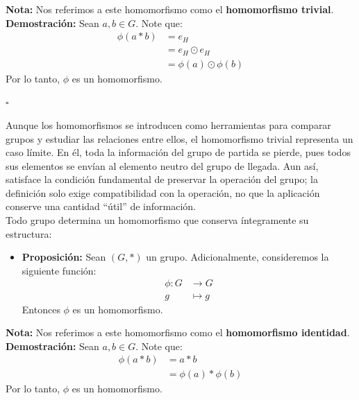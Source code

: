 \documentclass[10 pt]{article}
\begin{document}
\Large{\textbf{Nota:} Nos referimos a este homomorfismo como el \textbf{homomorfismo trivial}.} \\

\Large{\textbf{Demostración:} Sean $a,b \in G$. Note que:}
\begin{align*}
    \phi(a*b)&=e_H \\
    &=e_H \odot e_H \\
    &=\phi(a) \odot \phi(b)
\end{align*}
\Large{Por lo tanto, $\phi$ es un homomorfismo.} \\

\begin{flushright}
    $\square$
\end{flushright}

\Large{Aunque los homomorfismos se introducen como herramientas para comparar grupos y estudiar las relaciones entre ellos, el homomorfismo trivial representa un caso límite. En él, toda la información del grupo de partida se pierde, pues todos sus elementos se envían al elemento neutro del grupo de llegada. Aun así, satisface la condición fundamental de preservar la operación del grupo; la definición solo exige compatibilidad con la operación, no que la aplicación conserve una cantidad ``útil'' de información.} \\

\Large{Todo grupo determina un homomorfismo que conserva íntegramente su estructura:} \\

\begin{itemize}
    \item \Large{\textbf{Proposición:} Sean $(G,*)$ un grupo. Adicionalmente, consideremos la siguiente función:}
    \begin{align*}
        \phi:G &\rightarrow G \\
        g &\mapsto g
    \end{align*}
    \Large{Entonces $\phi$ es un homomorfismo.} \\
\end{itemize}

\Large{\textbf{Nota:} Nos referimos a este homomorfismo como el \textbf{homomorfismo identidad}.} \\

\Large{\textbf{Demostración:} Sean $a,b \in G$. Note que:}
\begin{align*}
    \phi(a*b)&=a*b \\
    &=\phi(a)*\phi(b) 
\end{align*}
\Large{Por lo tanto, $\phi$ es un homomorfismo.} \\
\end{document}

